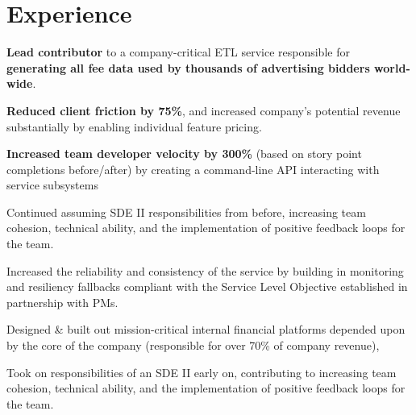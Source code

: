 \documentclass[]{two-column-resume}
\begin{document}
\begin{minipage}[t]{0.65\textwidth} 

\section{Experience}


 \vspace{\topsep} %
 
\begin{tightemize}
\item {\bf Lead contributor} to a company-critical ETL service responsible
for {\bf generating all fee data used by thousands of advertising bidders world-wide}.
\item {\bf Reduced client friction by 75\%}, and increased company's potential
revenue substantially by enabling individual feature pricing.
\item {\bf Increased team developer velocity by 300\%} (based on story point
completions before/after) by creating a command-line API interacting
with service subsystems
\item Continued assuming SDE II responsibilities from before, increasing team cohesion,
technical ability, and the implementation of positive feedback loops for the team.
\item Increased the reliability and consistency of the service by building in
monitoring and resiliency fallbacks compliant with the Service Level
Objective established in partnership with PMs.
\end{tightemize}
\sectionsep


\vspace{\topsep} %

\begin{tightemize}
\item Designed \& built out mission-critical internal financial platforms depended upon by the core of the company (responsible for over 70\% of company revenue), 
\item Took on responsibilities of an SDE II early on, contributing to increasing team cohesion, technical ability, and the implementation of positive feedback loops for the team.
\end{tightemize}
\sectionsep


\end{minipage}
\end{document}
